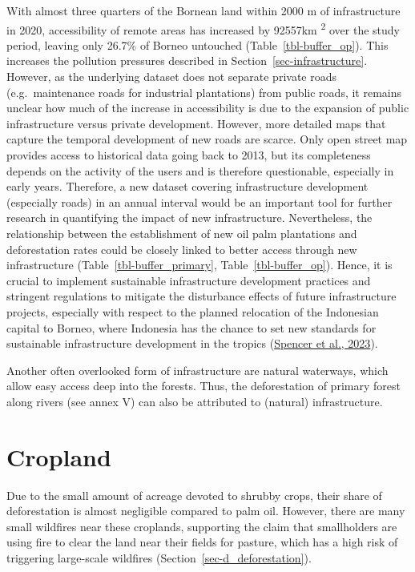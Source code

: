 \documentclass[
  letterpaper,
  DIV=11,
  numbers=noendperiod]{scrreprt}
\begin{document}
With almost three quarters of the Bornean land within 2000 m of
infrastructure in 2020, accessibility of remote areas has increased by
92557km \textsuperscript{2} over the study period, leaving only 26.7\%
of Borneo untouched (Table~\ref{tbl-buffer_op}). This increases the
pollution pressures described in Section~\ref{sec-infrastructure}.
However, as the underlying dataset does not separate private roads
(e.g.~maintenance roads for industrial plantations) from public roads,
it remains unclear how much of the increase in accessibility is due to
the expansion of public infrastructure versus private development.
However, more detailed maps that capture the temporal development of new
roads are scarce. Only open street map provides access to historical
data going back to 2013, but its completeness depends on the activity of
the users and is therefore questionable, especially in early years.
Therefore, a new dataset covering infrastructure development (especially
roads) in an annual interval would be an important tool for further
research in quantifying the impact of new infrastructure. Nevertheless,
the relationship between the establishment of new oil palm plantations
and deforestation rates could be closely linked to better access through
new infrastructure (Table~\ref{tbl-buffer_primary},
Table~\ref{tbl-buffer_op}). Hence, it is crucial to implement
sustainable infrastructure development practices and stringent
regulations to mitigate the disturbance effects of future infrastructure
projects, especially with respect to the planned relocation of the
Indonesian capital to Borneo, where Indonesia has the chance to set new
standards for sustainable infrastructure development in the tropics
(\protect\hyperlink{ref-spencerImplicationsLargescaleInfrastructure2023}{Spencer
et al., 2023}).

Another often overlooked form of infrastructure are natural waterways,
which allow easy access deep into the forests. Thus, the deforestation
of primary forest along rivers (see annex V) can also be attributed to
(natural) infrastructure.

\hypertarget{cropland-1}{%
\section{Cropland}\label{cropland-1}}

Due to the small amount of acreage devoted to shrubby crops, their share
of deforestation is almost negligible compared to palm oil. However,
there are many small wildfires near these croplands, supporting the
claim that smallholders are using fire to clear the land near their
fields for pasture, which has a high risk of triggering large-scale
wildfires (Section~\ref{sec-d_deforestation}).
\end{document}
